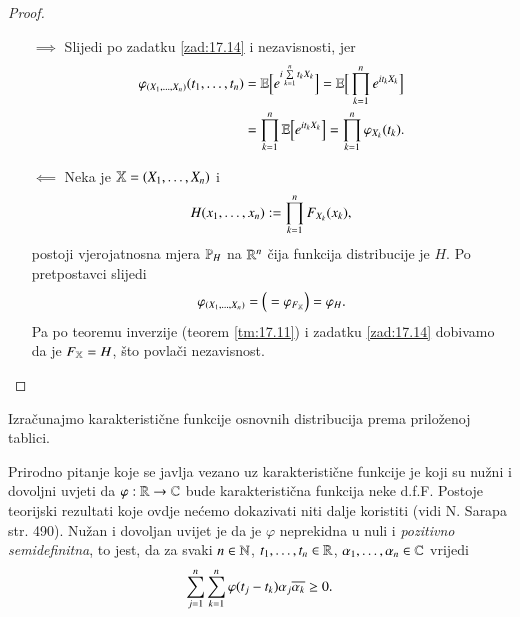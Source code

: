 \begin{proof}
    \begin{itemize}
        \item[$\implies$]
        Slijedi po zadatku \ref{zad:17.14} i nezavisnosti, jer
        \begin{equation*}
            \begin{aligned}
                \varphi_{(X_1, \ldots, X_n)} (t_1, \ldots, t_n) &= \mathbb{E} \Big[ e^{i \sum\limits_{k = 1}^{n} t_k X_k} \Big] = \mathbb{E} \Big[ \prod\limits_{k = 1}^{n} e^{i t_k X_k} \Big]\\
                &= \prod\limits_{k = 1}^{n} \mathbb{E} \Big[ e^{i t_k X_k} \Big] = \prod\limits_{k = 1}^{n} \varphi_{X_k} (t_k).
            \end{aligned}
        \end{equation*}
        \item[$\impliedby$]
        Neka je $\mathbb{X} = (X_1, \ldots, X_n)$ i
        \begin{equation*}
            H (x_1, \ldots, x_n) := \prod\limits_{k = 1}^{n} F_{X_k} (x_k),
        \end{equation*}
        postoji vjerojatnosna mjera $\mathbb{P}_H$ na $\mathbb{R}^n$ \v cija funkcija distribucije je $H$.
        Po pretpostavci slijedi
        \begin{equation*}
            \varphi_{(X_1, \ldots, X_n)} = \Big( = \varphi_{F_{\mathbb{X}}} \Big) = \varphi_H.
        \end{equation*}
        Pa po teoremu inverzije (teorem \ref{tm:17.11}) i zadatku \ref{zad:17.14} dobivamo da je $F_{\mathbb{X}} = H$, \v sto povla\v ci nezavisnost.
    \end{itemize}
\end{proof}

\begin{zad} \label{zad:17.16}
    Izra\v cunajmo karakteristi\v cne funkcije osnovnih distribucija prema prilo\v zenoj tablici.
\end{zad}

\begin{nap} \label{nap:17.17}
    Prirodno pitanje koje se javlja vezano uz karakteristi\v cne funkcije je koji su nu\v zni i dovoljni uvjeti da $\varphi : \mathbb{R} \to \mathbb{C}$ bude karakteristi\v cna funkcija neke d.f.F.
    Postoje teorijski rezultati koje ovdje ne\' cemo dokazivati niti dalje koristiti (vidi N. Sarapa str. 490).
    Nu\v zan i dovoljan uvijet je da je $\varphi$ neprekidna u nuli i \emph{pozitivno semidefinitna}, to jest, da za svaki $n \in \mathbb{N}$, $t_1, \ldots, t_n \in \mathbb{R}$, $\alpha_1, \ldots, \alpha_n \in \mathbb{C}$ vrijedi
    \begin{equation}    \label{jed:17.18}
        \sum\limits_{j = 1}^{n} \sum\limits_{k = 1}^{n} \varphi(t_j - t_k) \alpha_j \overline{\alpha_k} \geq 0.
    \end{equation} 
\end{nap}

